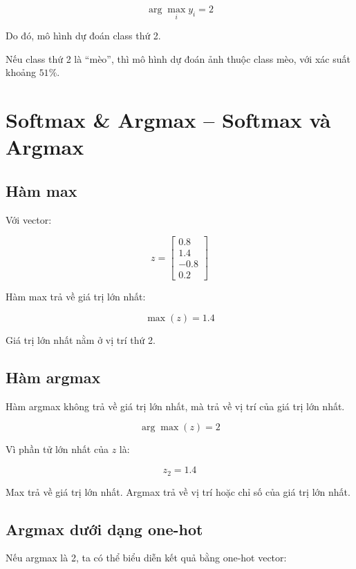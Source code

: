 \[
    \arg\max_i y_i = 2
\]

Do đó, mô hình dự đoán class thứ 2.

\begin{vidu}
Nếu class thứ 2 là ``mèo'', thì mô hình dự đoán ảnh thuộc class mèo, với xác suất khoảng $51\%$.
\end{vidu}

\section{Softmax \& Argmax -- Softmax và Argmax}

\subsection{Hàm max}

Với vector:

\[
    z =
    \begin{bmatrix}
    0.8\\
    1.4\\
    -0.8\\
    0.2
    \end{bmatrix}
\]

Hàm max trả về giá trị lớn nhất:

\[
    \max(z)=1.4
\]

Giá trị lớn nhất nằm ở vị trí thứ 2.

\subsection{Hàm argmax}

Hàm argmax không trả về giá trị lớn nhất, mà trả về vị trí của giá trị lớn nhất.

\[
    \arg\max(z)=2
\]

Vì phần tử lớn nhất của $z$ là:

\[
    z_2=1.4
\]

\begin{ghinho}
Max trả về giá trị lớn nhất. Argmax trả về vị trí hoặc chỉ số của giá trị lớn nhất.
\end{ghinho}

\subsection{Argmax dưới dạng one-hot}

Nếu argmax là 2, ta có thể biểu diễn kết quả bằng one-hot vector:

